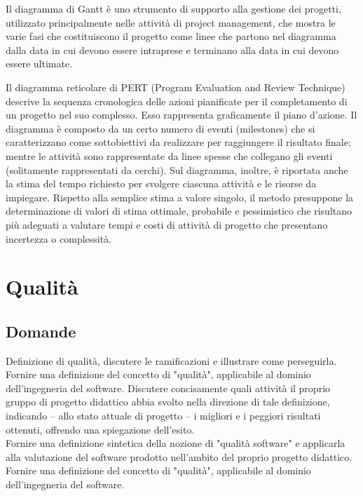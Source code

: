 Il diagramma di Gantt è uno strumento di supporto alla gestione dei progetti, utilizzato principalmente nelle attività di project management, che mostra le varie fasi che costituiscono il progetto come linee che partono nel diagramma dalla data in cui devono essere intraprese e terminano alla data in cui devono essere ultimate.

Il diagramma reticolare di PERT (Program Evaluation and Review Technique) descrive la sequenza cronologica delle azioni pianificate per il completamento di un progetto nel suo complesso. Esso rappresenta graficamente il piano d’azione. 
Il diagramma è composto da un certo numero di eventi (milestones) che si caratterizzano come sottobiettivi da realizzare per raggiungere il risultato finale; mentre le attività sono rappresentate da linee spesse che collegano gli eventi (solitamente rappresentati da cerchi). Sul diagramma, inoltre, è riportata anche la stima del tempo richiesto per svolgere ciascuna attività e le risorse da impiegare.
Rispetto alla semplice stima a valore singolo, il metodo presuppone la determinazione di valori di stima ottimale, probabile e pessimistico che risultano più adeguati a valutare tempi e costi di attività di progetto che presentano incertezza o complessità.


\section{Qualità}

\subsection*{Domande}
Definizione di qualità, discutere le ramificazioni e illustrare come perseguirla.\\

Fornire una definizione del concetto di "qualità", applicabile al dominio dell'ingegneria del software. 
Discutere concisamente quali attività il proprio gruppo di progetto didattico abbia svolto nella direzione di tale definizione, indicando – allo stato attuale di progetto – i migliori e i peggiori risultati ottenuti, offrendo una spiegazione dell'esito.\\

Fornire una definizione sintetica della nozione di "qualità software" e applicarla alla valutazione del software prodotto nell'ambito del proprio progetto didattico.\\

Fornire una definizione del concetto di "qualità", applicabile al dominio dell'ingegneria del software. \\


